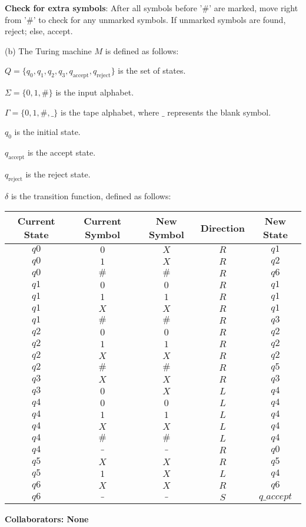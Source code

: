 \documentclass[12 pt]{article}
\begin{document}
\textbf{Check for extra symbols}: After all symbols before '\#' are marked, move right from '\#' to check for any unmarked symbols. If unmarked symbols are found, reject; else, accept.

\vspace{1cm}

(b)
\noindent The Turing machine \( M \) is defined as follows:


\( Q = \{ q_0, q_1, q_2, q_3, q_{\text{accept}}, q_{\text{reject}} \} \) is the set of states.


\( \Sigma = \{ 0, 1, \# \} \) is the input alphabet.


\( \Gamma = \{ 0, 1, \#, \_ \} \) is the tape alphabet, where \( \_ \) represents the blank symbol.


\( q_0 \) is the initial state.


\( q_{\text{accept}} \) is the accept state.


\( q_{\text{reject}} \) is the reject state.


\( \delta \) is the transition function, defined as follows:


\begin{center}
\begin{tabular}{|c|c|c|c|c|}
\hline
Current State & Current Symbol & New Symbol & Direction & New State \\
\hline
$q0$ & $0$   & $X$   & $R$ & $q1$ \\
$q0$ & $1$   & $X$   & $R$ & $q2$ \\
$q0$ & $\#$  & $\#$  & $R$ & $q6$ \\
\hline
$q1$ & $0$   & $0$   & $R$ & $q1$ \\
$q1$ & $1$   & $1$   & $R$ & $q1$ \\
$q1$ & $X$   & $X$   & $R$ & $q1$ \\
$q1$ & $\#$  & $\#$  & $R$ & $q3$ \\
\hline
$q2$ & $0$   & $0$   & $R$ & $q2$ \\
$q2$ & $1$   & $1$   & $R$ & $q2$ \\
$q2$ & $X$   & $X$   & $R$ & $q2$ \\
$q2$ & $\#$  & $\#$  & $R$ & $q5$ \\
\hline
$q3$ & $X$   & $X$   & $R$ & $q3$ \\
$q3$ & $0$   & $X$   & $L$ & $q4$ \\
\hline
$q4$ & $0$   & $0$   & $L$ & $q4$ \\
$q4$ & $1$   & $1$   & $L$ & $q4$ \\
$q4$ & $X$   & $X$   & $L$ & $q4$ \\
$q4$ & $\#$  & $\#$  & $L$ & $q4$ \\
$q4$ & $\_$  & $\_$  & $R$ & $q0$ \\
\hline
$q5$ & $X$   & $X$   & $R$ & $q5$ \\
$q5$ & $1$   & $X$   & $L$ & $q4$ \\
\hline
$q6$ & $X$   & $X$   & $R$ & $q6$ \\
$q6$ & $\_$  & $\_$  & $S$ & $q\_accept$ \\
\hline
\end{tabular}
\end{center}


\noindent\textbf{Collaborators: None}
\end{document}
